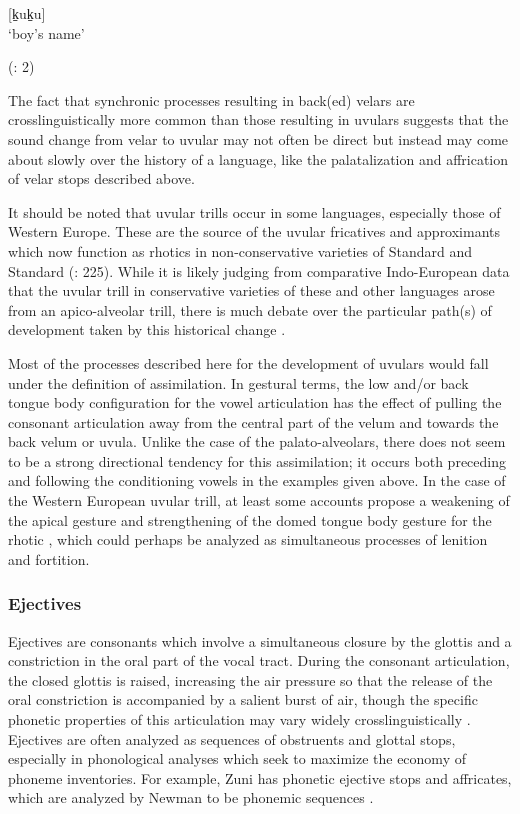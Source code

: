 [k̠uk̠u]\\
\glt ‘boy’s name’

(\citealt{BlackBlack1971}: 2)
\z

  The fact that synchronic processes resulting in back(ed) velars are crosslinguistically more common than those resulting in uvulars suggests that the sound change from velar to uvular may not often be direct but instead may come about slowly over the history of a language, like the palatalization and affrication of velar stops described above.

  It should be noted that uvular trills occur in some languages, especially those of Western Europe. These are the source of the uvular fricatives and approximants which now function as rhotics in non-conservative varieties of Standard  and Standard  (\citealt{LadefogedMaddieson1996}: 225). While it is likely judging from comparative Indo-European data that the uvular trill in conservative varieties of these and other languages arose from an apico-alveolar trill, there is much debate over the particular path(s) of development taken by this historical change \citep{Schiller1999}.

  Most of the processes described here for the development of uvulars would fall under the definition of assimilation. In gestural terms, the low and/or back tongue body configuration for the vowel articulation has the effect of pulling the consonant articulation away from the central part of the velum and towards the back velum or uvula. Unlike the case of the palato-alveolars, there does not seem to be a strong directional tendency for this assimilation; it occurs both preceding and following the conditioning vowels in the examples given above. In the case of the Western European uvular trill, at least some accounts propose a weakening of the apical gesture and strengthening of the domed tongue body gesture for the rhotic \citep{Schiller1999}, which could perhaps be analyzed as simultaneous processes of lenition and fortition.

\subsubsection{Ejectives}\label{sec:4.5.2.3}

  Ejectives are consonants which involve a simultaneous closure by the glottis and a constriction in the oral part of the vocal tract. During the consonant articulation, the closed glottis is raised, increasing the air pressure so that the release of the oral constriction is accompanied by a salient burst of air, though the specific phonetic properties of this articulation may vary widely crosslinguistically \citep{Lindau1984}. Ejectives are often analyzed as sequences of obstruents and glottal stops, especially in phonological analyses which seek to maximize the economy of phoneme inventories. For example, Zuni has phonetic ejective stops and affricates, which are analyzed by Newman to be phonemic sequences .

